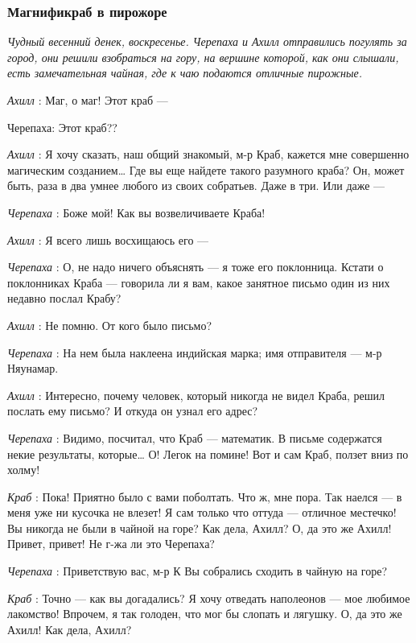 \subsubsection{Магнификраб в пирожоре}

\emph{Чудный весенний денек, воскресенье. Черепаха и Ахилл отправились погулять за город, они решили взобраться на гору, на вершине которой, как они слышали, есть замечательная чайная, где к чаю подаются отличные пирожные.}

\emph{Ахилл} : Маг, о маг! Этот краб ---

Черепаха: Этот краб??

\emph{Ахилл} : Я хочу сказать, наш общий знакомый, м-р Краб, кажется мне совершенно магическим созданием\ldots{} Где вы еще найдете такого разумного краба? Он, может быть, раза в два умнее любого из своих собратьев. Даже в три. Или даже ---

\emph{Черепаха} : Боже мой! Как вы возвеличиваете Краба!

\emph{Ахилл} : Я всего лишь восхищаюсь его ---

\emph{Черепаха} : О, не надо ничего объяснять --- я тоже его поклонница. Кстати о поклонниках Краба --- говорила ли я вам, какое занятное письмо один из них недавно послал Крабу?

\emph{Ахилл} : Не помню. От кого было письмо?

\emph{Черепаха} : На нем была наклеена индийская марка; имя отправителя --- м-р Няунамар.

\emph{Ахилл} : Интересно, почему человек, который никогда не видел Краба, решил послать ему письмо? И откуда он узнал его адрес?

\emph{Черепаха} : Видимо, посчитал, что Краб --- математик. В письме содержатся некие результаты, которые\ldots{} О! Легок на помине! Вот и сам Краб, ползет вниз по холму!

\emph{Краб} : Пока! Приятно было с вами поболтать. Что ж, мне пора. Так наелся --- в меня уже ни кусочка не влезет! Я сам только что оттуда --- отличное местечко! Вы никогда не были в чайной на горе? Как дела, Ахилл? О, да это же Ахилл! Привет, привет! Не г-жа ли это Черепаха?

\emph{Черепаха} : Приветствую вас, м-р К Вы собрались сходить в чайную на горе?

\emph{Краб} : Точно --- как вы догадались? Я хочу отведать наполеонов --- мое любимое лакомство! Впрочем, я так голоден, что мог бы слопать и лягушку. О, да это же Ахилл! Как дела, Ахилл?

